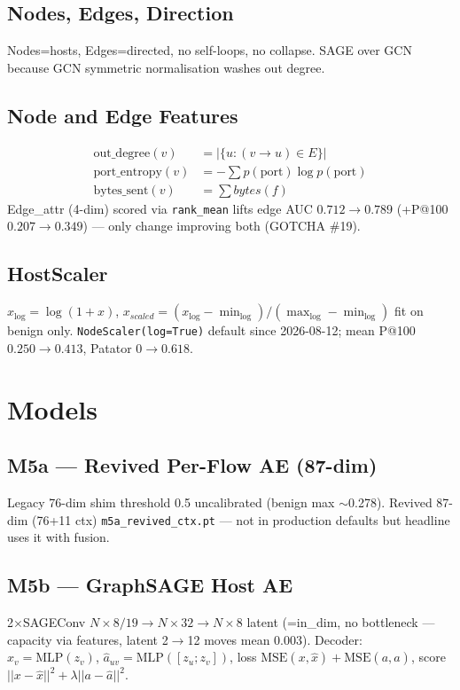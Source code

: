 \documentclass[12pt,a4paper,oneside]{report}
\begin{document}
\subsection{Nodes, Edges, Direction}
Nodes=hosts, Edges=directed, no self-loops, no collapse. SAGE over GCN because GCN symmetric normalisation washes out degree.

\subsection{Node and Edge Features}
\begin{align}
\text{out\_degree}(v) &= |\{u:(v\rightarrow u)\in E\}| \nonumber\\
\text{port\_entropy}(v) &= -\sum p(\text{port})\log p(\text{port}) \nonumber\\
\text{bytes\_sent}(v) &= \sum bytes(f) \nonumber
\end{align}
Edge\_attr (4-dim) scored via \texttt{rank\_mean} lifts edge AUC $0.712\rightarrow0.789$ (+P@100 $0.207\rightarrow0.349$) — only change improving both (GOTCHA \#19).

\subsection{HostScaler}
$x_{\log}=\log(1+x)$, $x_{scaled}=(x_{\log}-\min_{\log})/(\max_{\log}-\min_{\log})$ fit on benign only. \texttt{NodeScaler(log=True)} default since 2026-08-12; mean P@100 $0.250\rightarrow0.413$, Patator $0\rightarrow0.618$.

\section{Models}
\subsection{M5a — Revived Per-Flow AE (87-dim)}
Legacy 76-dim shim threshold 0.5 uncalibrated (benign max $\sim$0.278). Revived 87-dim (76+11 ctx) \texttt{m5a\_revived\_ctx.pt} — not in production defaults but headline uses it with fusion.

\subsection{M5b — GraphSAGE Host AE}
2$\times$SAGEConv $N\times8/19\rightarrow N\times32\rightarrow N\times8$ latent (=in\_dim, no bottleneck — capacity via features, latent 2$\rightarrow$12 moves mean 0.003). Decoder: $\hat{x}_v=\text{MLP}(z_v)$, $\hat{a}_{uv}=\text{MLP}([z_u;z_v])$, loss $\text{MSE}(x,\hat{x})+\text{MSE}(a,\hat{a})$, score $||x-\hat{x}||^2+\lambda||a-\hat{a}||^2$.
\end{document}
